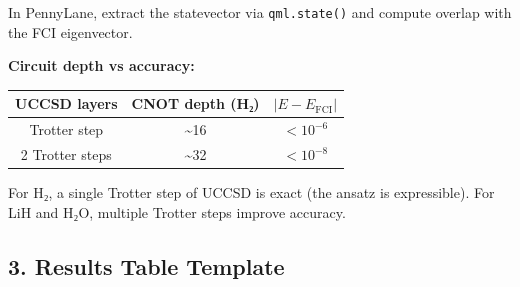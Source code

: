 \documentclass[
  11pt,
]{report}
\newcounter{none} %
\begin{document}
In PennyLane, extract the statevector via \texttt{qml.state()} and
compute overlap with the FCI eigenvector.

\textbf{Circuit depth vs accuracy:}

{\def\LTcaptype{none} %
\begin{longtable}[]{@{}ccc@{}}
\toprule\noalign{}
UCCSD layers & CNOT depth (H₂) & \(|E - E_{\text{FCI}}|\) \\
\midrule\noalign{}
\endhead
\bottomrule\noalign{}
\endlastfoot
1 Trotter step & \textasciitilde16 & \(< 10^{-6}\) \\
2 Trotter steps & \textasciitilde32 & \(< 10^{-8}\) \\
\end{longtable}
}

For H₂, a single Trotter step of UCCSD is exact (the ansatz is
expressible). For LiH and H₂O, multiple Trotter steps improve accuracy.

\subsection{3. Results Table Template}\label{results-table-template}
\end{document}
